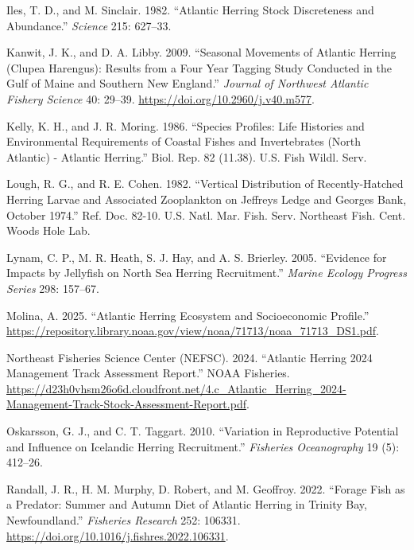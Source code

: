 \documentclass[
  letterpaper,
  DIV=11,
  numbers=noendperiod]{scrartcl}
\newlength{\cslhangindent}
\newenvironment{CSLReferences}[2] %
 {\begin{list}{}{%
  \setlength{\itemindent}{0pt}
  \setlength{\leftmargin}{0pt}
  \setlength{\parsep}{0pt}
  \ifodd #1
   \setlength{\leftmargin}{\cslhangindent}
   \setlength{\itemindent}{-1\cslhangindent}
  \fi
  \setlength{\itemsep}{#2\baselineskip}}}
 {\end{list}}
\begin{document}
\begin{CSLReferences}{1}{0}
Iles, T. D., and M. Sinclair. 1982. {``Atlantic Herring Stock
Discreteness and Abundance.''} \emph{Science} 215: 627--33.

Kanwit, J. K., and D. A. Libby. 2009. {``Seasonal Movements of Atlantic
Herring (Clupea Harengus): Results from a Four Year Tagging Study
Conducted in the Gulf of Maine and Southern New England.''}
\emph{Journal of Northwest Atlantic Fishery Science} 40: 29--39.
\url{https://doi.org/10.2960/j.v40.m577}.

Kelly, K. H., and J. R. Moring. 1986. {``Species Profiles: Life
Histories and Environmental Requirements of Coastal Fishes and
Invertebrates (North Atlantic) - Atlantic Herring.''} Biol. Rep. 82
(11.38). U.S. Fish Wildl. Serv.

Lough, R. G., and R. E. Cohen. 1982. {``Vertical Distribution of
Recently-Hatched Herring Larvae and Associated Zooplankton on Jeffreys
Ledge and Georges Bank, October 1974.''} Ref. Doc. 82-10. U.S. Natl.
Mar. Fish. Serv. Northeast Fish. Cent. Woods Hole Lab.

Lynam, C. P., M. R. Heath, S. J. Hay, and A. S. Brierley. 2005.
{``Evidence for Impacts by Jellyfish on North Sea Herring
Recruitment.''} \emph{Marine Ecology Progress Series} 298: 157--67.

Molina, A. 2025. {``Atlantic Herring Ecosystem and Socioeconomic
Profile.''}
\url{https://repository.library.noaa.gov/view/noaa/71713/noaa_71713_DS1.pdf}.

Northeast Fisheries Science Center (NEFSC). 2024. {``Atlantic Herring
2024 Management Track Assessment Report.''} NOAA Fisheries.
\url{https://d23h0vhsm26o6d.cloudfront.net/4.c_Atlantic_Herring_2024-Management-Track-Stock-Assessment-Report.pdf}.

Oskarsson, G. J., and C. T. Taggart. 2010. {``Variation in Reproductive
Potential and Influence on Icelandic Herring Recruitment.''}
\emph{Fisheries Oceanography} 19 (5): 412--26.

Randall, J. R., H. M. Murphy, D. Robert, and M. Geoffroy. 2022.
{``Forage Fish as a Predator: Summer and Autumn Diet of Atlantic Herring
in Trinity Bay, Newfoundland.''} \emph{Fisheries Research} 252: 106331.
\url{https://doi.org/10.1016/j.fishres.2022.106331}.


\end{CSLReferences}
\end{document}
